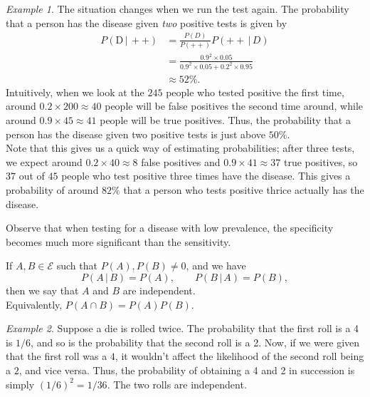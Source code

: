 \documentclass[11pt]{article}
\theoremstyle{definition}
\theoremstyle{remark}
\newtheorem*{example}{Example}
\numberwithin{equation}{module}
\begin{document}
\begin{example}
        The situation changes when we run the test again. The probability that a
        person has the disease given \textit{two} positive tests is given by
        \begin{align*}
            P(\text{D} \,|\, {+}{+}) &= \frac{P(D)}{P({+}{+})}P({+}{+} \,|\, D) \\
                &= \frac{0.9^2 \times 0.05}{0.9^2\times 0.05 + 0.2^2\times 0.95} \\
                &\approx 52\%.
        \end{align*}
        Intuitively, when we look at the $245$ people who tested positive the first
        time, around $0.2\times 200 \approx 40$ people will be false positives the
        second time around, while around $0.9 \times 45 \approx 41$ people will be
        true positives. Thus, the probability that a person has the disease given
        two positive tests is just above $50\%$. \\

        Note that this gives us a quick way of estimating probabilities; after three
        tests, we expect around $0.2 \times 40 \approx 8$ false positives and $0.9
        \times 41 \approx 37$ true positives, so $37$ out of $45$ people who test
        positive three times have the disease. This gives a probability of around
        $82\%$ that a person who tests positive thrice actually has the disease. 

        Observe that when testing for a disease with low prevalence, the specificity
        becomes much more significant than the sensitivity.
    \end{example}
    
    \begin{definition}
        If $A, B \in \mathcal{E}$ such that $P(A), P(B) \neq 0$, and we have \[
            P(A \,|\, B) = P(A), \qquad P(B \,|\, A) = P(B),
        \] then we say that
        $A$ and $B$ are independent. \\

        \noindent Equivalently, $P(A \cap B) = P(A) P(B)$.
    \end{definition}
    \begin{example}
        Suppose a die is rolled twice. The probability that the first roll is a 4
        is $1 / 6$, and so is the probability that the second roll is a 2.
        Now, if we were given that the first roll was a $4$, it wouldn't affect the
        likelihood of the second roll being a $2$, and vice versa. Thus, the
        probability of obtaining a 4 and 2 in succession is simply $(1 /6)^2 = 1
        /36$. The two rolls are independent.
    \end{example}
\end{document}
